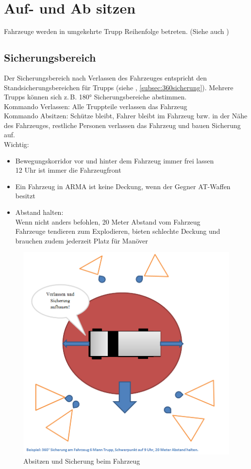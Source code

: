 \pagebreak
\section{Auf- und Ab sitzen}
	Fahrzeuge werden in umgekehrte Trupp Reihenfolge betreten. (Siehe auch )
	
\subsection{Sicherungsbereich}
	Der Sicherungsbereich nach Verlassen des Fahrzeuges entspricht den Standsicherungsbereichen für  Trupps (siehe , \autoref{subsec:360sicherung}). Mehrere Trupps können sich z.\,B. 180° Sicherungsbereiche abstimmen. \\
	Kommando Verlassen: Alle Truppteile verlassen das Fahrzeug \\
	Kommando Absitzen: Schütze bleibt, Fahrer bleibt im Fahrzeug bzw. in der Nähe des Fahrzeuges, restliche Personen verlassen das Fahrzeug und bauen Sicherung auf.\\
	
	Wichtig:
	\begin{itemize}
		\item Bewegungskorridor vor und hinter dem Fahrzeug immer frei lassen\\ 12 Uhr ist immer die Fahrzeugfront
		\item Ein Fahrzeug in ARMA ist keine Deckung, wenn der Gegner AT-Waffen besitzt
		\item Abstand halten:\\ Wenn nicht anders befohlen, 20 Meter Abstand vom Fahrzeug\\ Fahrzeuge tendieren zum Explodieren, bieten schlechte Deckung und brauchen zudem jederzeit Platz für Manöver
	\end{itemize}
	\begin{figure}[htbp]
		\centering
		\includegraphics[width=15cm]{./img/grundlagen/umgangMitFahrzeugen/Fahrzeug_verlassen.png}
		\caption{Absitzen und Sicherung beim Fahrzeug}
	\end{figure}
